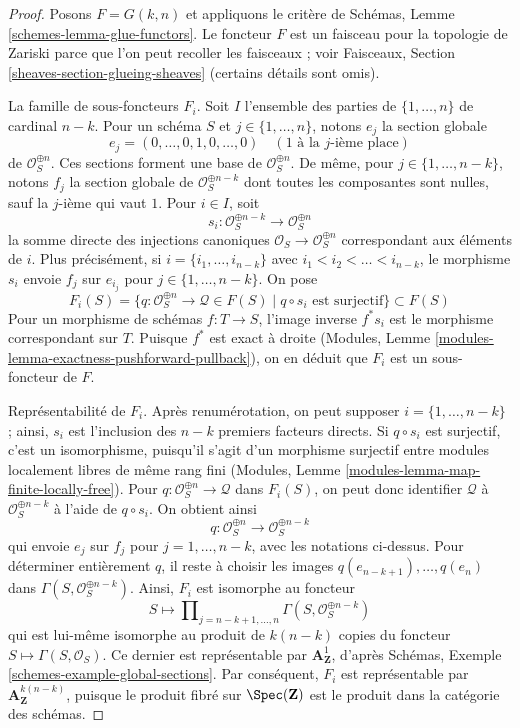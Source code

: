 \begin{proof}
Posons $F = G(k, n)$ et appliquons le critère de Schémas,
Lemme \ref{schemes-lemma-glue-functors}.
Le foncteur $F$ est un faisceau pour la topologie de Zariski parce que
l'on peut recoller les faisceaux ; voir Faisceaux,
Section \ref{sheaves-section-glueing-sheaves} (certains détails sont omis).

\medskip\noindent
La famille de sous-foncteurs $F_i$.
Soit $I$ l'ensemble des parties de $\{1, \ldots, n\}$ de cardinal $n - k$.
Pour un schéma $S$ et $j \in \{1, \ldots, n\}$, notons $e_j$ la section
globale
$$
e_j = (0, \ldots, 0, 1, 0, \ldots, 0)\quad(1\text{ à la }j\text{-ième place})
$$
de $\mathcal{O}_S^{\oplus n}$. Ces sections forment une base de
$\mathcal{O}_S^{\oplus n}$. De même, pour $j \in \{1, \ldots, n - k\}$,
notons $f_j$ la section globale de $\mathcal{O}_S^{\oplus n - k}$ dont
toutes les composantes sont nulles, sauf la $j$-ième qui vaut $1$.
Pour $i \in I$, soit
$$
s_i : \mathcal{O}_S^{\oplus n - k} \longrightarrow \mathcal{O}_S^{\oplus n}
$$
la somme directe des injections canoniques
$\mathcal{O}_S \to \mathcal{O}_S^{\oplus n}$ correspondant aux éléments
de $i$. Plus précisément, si $i = \{i_1, \ldots, i_{n - k}\}$ avec
$i_1 < i_2 < \ldots < i_{n - k}$, le morphisme $s_i$ envoie $f_j$ sur
$e_{i_j}$ pour $j \in \{1, \ldots, n - k\}$. On pose
$$
F_i(S) = \{q : \mathcal{O}_S^{\oplus n} \to \mathcal{Q} \in F(S) \mid
q \circ s_i \text{ est surjectif}\}
\subset F(S)
$$
Pour un morphisme de schémas $f : T \to S$, l'image inverse $f^*s_i$ est
le morphisme correspondant sur $T$. Puisque $f^*$ est exact à droite
(Modules, Lemme \ref{modules-lemma-exactness-pushforward-pullback}),
on en déduit que $F_i$ est un sous-foncteur de $F$.

\medskip\noindent
Représentabilité de $F_i$. Après renumérotation, on peut supposer
$i = \{1, \ldots, n - k\}$ ; ainsi, $s_i$ est l'inclusion des
$n - k$ premiers facteurs directs. Si $q \circ s_i$ est surjectif, c'est
un isomorphisme, puisqu'il s'agit d'un morphisme surjectif entre modules
localement libres de même rang fini (Modules,
Lemme \ref{modules-lemma-map-finite-locally-free}).
Pour $q : \mathcal{O}_S^{\oplus n} \to \mathcal{Q}$ dans $F_i(S)$, on
peut donc identifier $\mathcal{Q}$ à $\mathcal{O}_S^{\oplus n - k}$ à
l'aide de $q \circ s_i$. On obtient ainsi
$$
q : \mathcal{O}_S^{\oplus n} \longrightarrow \mathcal{O}_S^{\oplus n - k}
$$
qui envoie $e_j$ sur $f_j$ pour $j = 1, \ldots, n - k$, avec les notations
ci-dessus. Pour déterminer entièrement $q$, il reste à choisir les images
$q(e_{n - k + 1}), \ldots, q(e_n)$ dans
$\Gamma(S, \mathcal{O}_S^{\oplus n - k})$.
Ainsi, $F_i$ est isomorphe au foncteur
$$
S \longmapsto
\prod\nolimits_{j = n - k + 1, \ldots, n}
\Gamma(S,  \mathcal{O}_S^{\oplus n - k})
$$
qui est lui-même isomorphe au produit de $k(n - k)$ copies du foncteur
$S \mapsto \Gamma(S, \mathcal{O}_S)$. Ce dernier est représentable par
$\mathbf{A}^1_\mathbf{Z}$, d'après Schémas,
Exemple \ref{schemes-example-global-sections}. Par conséquent, $F_i$ est
représentable par $\mathbf{A}^{k(n - k)}_\mathbf{Z}$, puisque le produit
fibré sur $\Spec(\mathbf{Z})$ est le produit dans la catégorie des schémas.


\end{proof}
